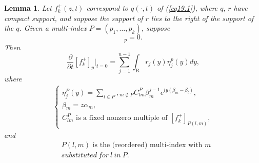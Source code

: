 \documentclass{surv-l}
\theoremstyle{plain}
\newtheorem{lemma}[theorem]{Lemma}
\theoremstyle{definition}
\numberwithin{equation}{chapter}
\begin{document}
\begin{lemma}\label{lem19.4}
Let $f_{k}^{+}(z,t)$  correspond to $q(\cdot, t)$ of \emph{(\ref{eq19.1})},  where $q,\,r$  have
compact support, and suppose the support of $r$ lies to the right of the support of the $q$. Given a multi-index $P= (p_{1},\ldots,p_{k})$, suppose
\begin{equation*}
[f_{k}^{+}(z, 0)]_{p}=0.
\end{equation*}
Then
\setcounter{equation}{4}
\begin{equation}\label{eq19.5}
\frac{\partial}{\partial t}[f_{k}^{+}]_{p}|_{t=0}=\sum_{j=1}^{n-1}\int_{\mathrm{R}}r_{j}(y)\eta_{j}^{p}(y)dy,
\end{equation}
where
\begin{align}\label{eq19.6}
\left\{\begin{array}{l}
\eta_{j}^{P}(y)=\sum_{l\in P},{}_{m\not\in P}C_{lm}^{P}\beta_{m}^{j-1}e^{iy(\beta_{m}-\beta_{l})},\\
\beta_{m}=z\alpha_{m},\\
C_{lm}^{P}\text{ is  a  fixed  nonzero  multiple  of }[f_{k}^{+}]_{P(l,m)},
\end{array}\right.
\end{align}
and
\begin{align}\label{eq19.7}
&P(l, m)\text{ is the (reordered) multi-index with }m \\ \nonumber
&substituted \ for\  l\ in\ P.
\end{align}
\end{lemma}
\end{document}
